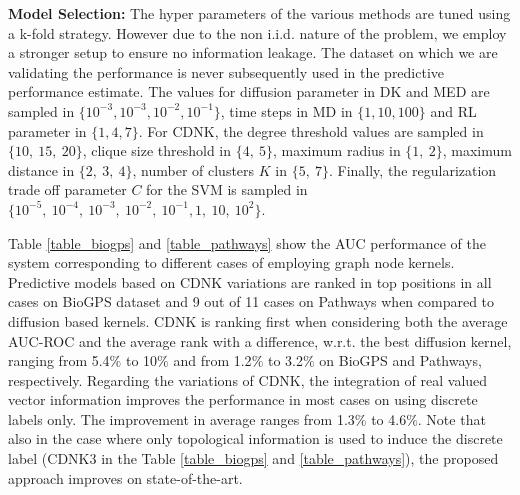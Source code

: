 \documentclass[review]{elsarticle}
\begin{document}
\textbf{Model Selection:}
The hyper parameters of the various methods are tuned using a k-fold strategy. However due to the non i.i.d. nature of the problem, we employ a stronger setup to ensure no information leakage. The dataset on which we are validating the performance is never subsequently used in the predictive performance estimate. The values for diffusion parameter in DK and MED are sampled in $\lbrace 10^{-3}, 10^{-3}, 10^{-2}, 10^{-1} \rbrace$, time steps in MD in $\lbrace 1, 10, 100 \rbrace$ and RL parameter in $\lbrace 1, 4, 7 \rbrace$. For CDNK, the degree threshold values are sampled in $\lbrace 10,\ 15,\ 20 \rbrace$, clique size threshold in $\lbrace 4,\ 5 \rbrace$, maximum radius in $\lbrace 1,\ 2 \rbrace$, maximum distance in $\lbrace 2,\ 3,\ 4 \rbrace$, number of clusters $K$ in $\lbrace 5,\ 7 \rbrace$. Finally, the regularization trade off parameter $C$ for the SVM is sampled in $\lbrace 10^{-5},  \ 10^{-4}, \ 10^{-3},\ 10^{-2},\ 10^{-1}, 1,\ 10,\ 10^2 \rbrace$.

Table \ref{table_biogps} and \ref{table_pathways} show the AUC performance of the system corresponding to different cases of employing graph node kernels. Predictive models based on CDNK variations are ranked in top positions in all cases on BioGPS dataset and 9 out of 11 cases on Pathways when compared to diffusion based kernels. CDNK is ranking first when considering both the average AUC-ROC and the average rank with a difference, w.r.t. the best diffusion kernel, ranging from 5.4$\%$ to 10$\%$ and from 1.2$\%$ to 3.2$\%$ on BioGPS and Pathways, respectively. Regarding the variations of CDNK, the integration of real valued vector information improves the performance in most cases on using discrete labels only. The improvement in average ranges from 1.3$\%$ to 4.6$\%$. Note that also in the case where only topological information is used to induce the discrete label (CDNK3 in the Table \ref{table_biogps} and \ref{table_pathways}), the proposed approach improves on state-of-the-art. 
\end{document}
